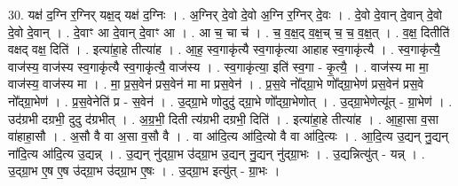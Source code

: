 \documentclass[17pt]{extarticle}
\begin{document}
30. यक्ष॑ द॒ग्नि र॒ग्निर् यक्ष॒द् यक्ष॑ द॒ग्निः । . अ॒ग्निर् दे॒वो दे॒वो अ॒ग्नि र॒ग्निर् दे॒वः । . दे॒वो दे॒वान् दे॒वान् दे॒वो दे॒वो दे॒वान् । . दे॒वाꣳ आ दे॒वान् दे॒वाꣳ आ । . आ च॒ चा च॑ । . च॒ व॒क्ष॒द् व॒क्ष॒च् च॒ च॒ व॒क्ष॒त् । . व॒क्ष॒ दितीति॑ वक्षद् वक्ष॒ दिति॑ । . इत्या॑हा॒हे तीत्या॑ह । . आ॒ह॒ स्व॒गाकृ॑त्यै स्व॒गाकृ॑त्या आहाह स्व॒गाकृ॑त्यै । . स्व॒गाकृ॑त्यै॒ वाज॑स्य॒ वाज॑स्य स्व॒गाकृ॑त्यै स्व॒गाकृ॑त्यै॒ वाज॑स्य । . स्व॒गाकृ॑त्या॒ इति॑ स्व॒गा - कृ॒त्यै॒ । . वाज॑स्य मा मा॒ वाज॑स्य॒ वाज॑स्य मा । . मा॒ प्र॒स॒वेन॑ प्रस॒वेन॑ मा मा प्रस॒वेन॑ । . प्र॒स॒वे नो᳚द्ग्रा॒भे णो᳚द्ग्रा॒भेण॑ प्रस॒वेन॑ प्रस॒वे नो᳚द्ग्रा॒भेण॑ । . प्र॒स॒वेनेति॑ प्र - स॒वेन॑ । . उ॒द्ग्रा॒भे णोदुदु॑ द्ग्रा॒भे णो᳚द्ग्रा॒भेणोत् । . उ॒द्ग्रा॒भेणेत्यू॑त् - ग्रा॒भेण॑ । . उद॑ग्रभी दग्रभी॒ दुदु द॑ग्रभीत् । . अ॒ग्र॒भी॒ दिती त्य॑ग्रभी दग्रभी॒ दिति॑ । . इत्या॑हा॒हे तीत्या॑ह । . आ॒हा॒सा व॒सा वा॑हाहा॒सौ । . अ॒सौ वै वा अ॒सा व॒सौ वै । . वा आ॑दि॒त्य आ॑दि॒त्यो वै वा आ॑दि॒त्यः । . आ॒दि॒त्य उ॒द्यन् नु॒द्यन् ना॑दि॒त्य आ॑दि॒त्य उ॒द्यन्न् । . उ॒द्यन् नु॑द्ग्रा॒भ उ॑द्ग्रा॒भ उ॒द्यन् नु॒द्यन् नु॑द्ग्रा॒भः । . उ॒द्यन्नित्यु॑त् - यन्न् । . उ॒द्ग्रा॒भ ए॒ष ए॒ष उ॑द्ग्रा॒भ उ॑द्ग्रा॒भ ए॒षः । . उ॒द्ग्रा॒भ इत्यु॑त् - ग्रा॒भः । \newline
\end{document}
